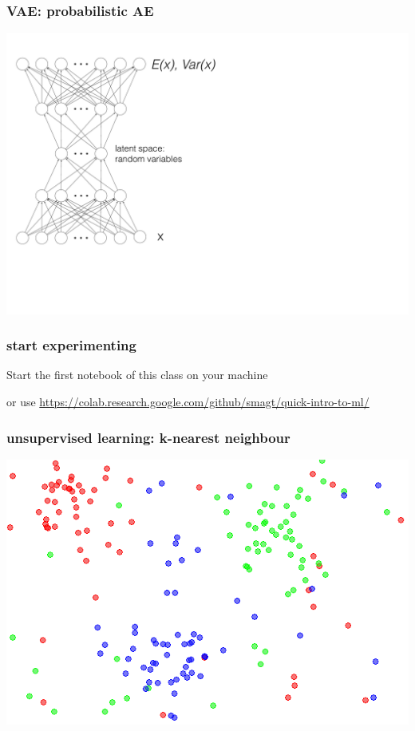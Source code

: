\documentclass[USenglish,pdftex,compress,10pt,svgnamesi]{beamer}%
\begin{document}
\begin{frame}
\frametitle{VAE:  probabilistic AE}

\includegraphics[scale=0.3]{vae.pdf}
\end{frame}




\begin{frame}
\frametitle{start experimenting}

Start the first notebook of this class on your machine

or use 
\url{https://colab.research.google.com/github/smagt/quick-intro-to-ml/}

\end{frame}


\begin{frame}
\frametitle{unsupervised learning: k-nearest neighbour}

 \includegraphics[width=\textwidth]{knn}

\end{frame}
\end{document}
